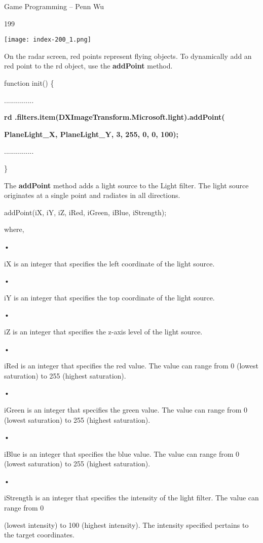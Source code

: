 \documentclass[
]{article}
\begin{document}
Game Programming -- Penn Wu

199

\protect\hypertarget{index_split_011.htmlux5cux23p200}{}{}\texttt{[image: index-200\_1.png]}

On the radar screen, red points represent flying objects. To dynamically
add an red point to the rd object, use the \textbf{addPoint} method.

function init() \{

...............

\textbf{rd
.filters.item(\textquotesingle DXImageTransform.Microsoft.light\textquotesingle).addPoint(}

\textbf{PlaneLight\_X, PlaneLight\_Y, 3, 255, 0, 0, 100);}

...............

\}

The \textbf{addPoint} method adds a light source to the Light filter.
The light source originates at a single point and radiates in all
directions.

addPoint(iX, iY, iZ, iRed, iGreen, iBlue, iStrength);

where,

•

iX is an integer that specifies the left coordinate of the light source.

•

iY is an integer that specifies the top coordinate of the light source.

•

iZ is an integer that specifies the z-axis level of the light source.

•

iRed is an integer that specifies the red value. The value can range
from 0 (lowest saturation) to 255 (highest saturation).

•

iGreen is an integer that specifies the green value. The value can range
from 0 (lowest saturation) to 255 (highest saturation).

•

iBlue is an integer that specifies the blue value. The value can range
from 0 (lowest saturation) to 255 (highest saturation).

•

iStrength is an integer that specifies the intensity of the light
filter. The value can range from 0

(lowest intensity) to 100 (highest intensity). The intensity specified
pertains to the target coordinates.
\end{document}
